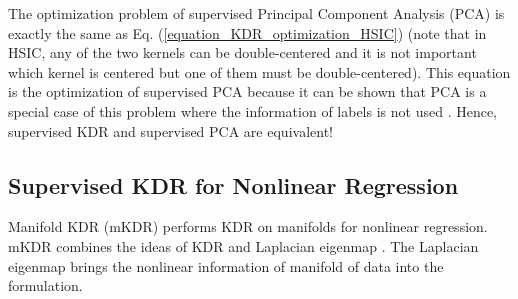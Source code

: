 \documentclass[lang=cn,10pt]{gorgeousnbook}
\numberwithin{equation}{section}%
\numberwithin{figure}{section}%
\begin{document}
\begin{corollary}
The optimization problem of supervised Principal Component Analysis (PCA) \cite{barshan2011supervised} is exactly the same as Eq. (\ref{equation_KDR_optimization_HSIC}) (note that in HSIC, any of the two kernels can be double-centered and it is not important which kernel is centered but one of them must be double-centered). This equation is the optimization of supervised PCA because it can be shown that PCA is a special case of this problem where the information of labels is not used \cite{ghojogh2019unsupervised}. Hence, supervised KDR and supervised PCA are equivalent!
\end{corollary}

\subsection{Supervised KDR for Nonlinear Regression}

Manifold KDR (mKDR) \cite{nilsson2007regression} performs KDR on manifolds for nonlinear regression.  
mKDR combines the ideas of KDR and Laplacian eigenmap \cite{belkin2001laplacian,ghojogh2021laplacian}. The Laplacian eigenmap brings the nonlinear information of manifold of data into the formulation. 
\end{document}

